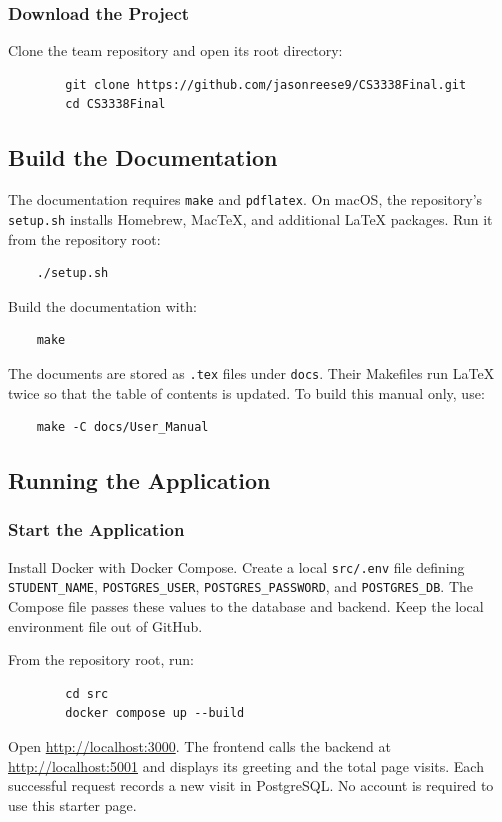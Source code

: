 	\subsubsection{Download the Project}
	Clone the team repository and open its root directory:
		\begin{verbatim}
		git clone https://github.com/jasonreese9/CS3338Final.git
		cd CS3338Final
		\end{verbatim}

\subsection{Build the Documentation}
	The documentation requires \texttt{make} and \texttt{pdflatex}.
	On macOS, the repository's \texttt{setup.sh} installs Homebrew, MacTeX, and additional LaTeX packages. Run it from the repository root:
	\begin{verbatim}
	./setup.sh
	\end{verbatim}
	Build the documentation with:
	\begin{verbatim}
	make
	\end{verbatim}
	The documents are stored as \texttt{.tex} files under \texttt{docs}. Their Makefiles run LaTeX twice so that the table of contents is updated. To build this manual only, use:
	\begin{verbatim}
	make -C docs/User_Manual
	\end{verbatim}

\subsection{Running the Application}
	\subsubsection{Start the Application}
		Install Docker with Docker Compose. Create a local \texttt{src/.env} file defining \texttt{STUDENT\_NAME}, \texttt{POSTGRES\_USER}, \texttt{POSTGRES\_PASSWORD}, and \texttt{POSTGRES\_DB}. The Compose file passes these values to the database and backend. Keep the local environment file out of GitHub.

		From the repository root, run:
		\begin{verbatim}
		cd src
		docker compose up --build
		\end{verbatim}
		Open \url{http://localhost:3000}. The frontend calls the backend at \url{http://localhost:5001} and displays its greeting and the total page visits. Each successful request records a new visit in PostgreSQL. No account is required to use this starter page.

